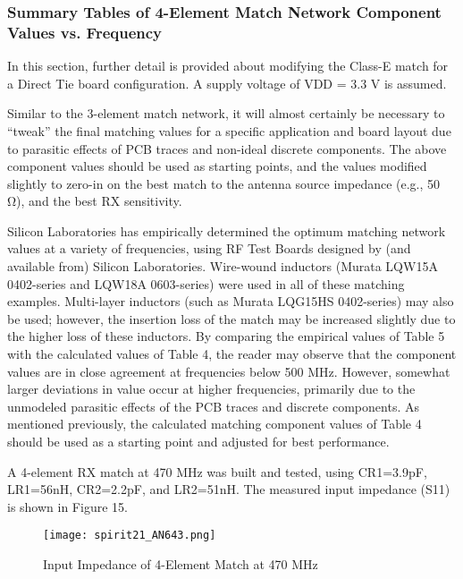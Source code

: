       \subsubsection{Summary Tables of 4-Element Match Network Component Values vs. Frequency}
        In this section, further detail is provided about modifying the Class-E match for a Direct 
        Tie board configuration. A supply voltage of VDD = 3.3 V is assumed.
        
        Similar to the 3-element match network, it will almost certainly be necessary to “tweak” 
        the final matching values for a specific application and board layout due to parasitic 
        effects of PCB traces and non-ideal discrete components. The above component values should 
        be used as starting points, and the values modified slightly to zero-in on the best match 
        to the antenna source impedance (e.g., 50 Ω), and the best RX sensitivity. 
        
        Silicon Laboratories has empirically determined the optimum matching network values at a 
        variety of frequencies, using RF Test Boards designed by (and available from) Silicon 
        Laboratories. Wire-wound inductors (Murata LQW15A 0402-series and LQW18A 0603-series) were 
        used in all of these matching examples. Multi-layer inductors (such as Murata LQG15HS 
        0402-series) may also be used; however, the insertion loss of the match may be increased 
        slightly due to the higher loss of these inductors. By comparing the empirical values of 
        Table 5 with the calculated values of Table 4, the reader may observe that the component 
        values are in close agreement at frequencies below 500 MHz. However, somewhat larger 
        deviations in value occur at higher frequencies, primarily due to the unmodeled 
        parasitic effects of the PCB traces and discrete components. As mentioned previously, the 
        calculated matching component values of Table 4 should be used as a starting point and 
        adjusted for best performance.
        
        A 4-element RX match at 470 MHz was built and tested, using CR1=3.9pF, LR1=56nH, CR2=2.2pF, 
        and LR2=51nH. The measured input impedance (S11) is shown in Figure 15.

        \begin{figure}[ht!] %
          \centering
          \texttt{[image: spirit21\_AN643.png]}
          \caption{Input Impedance of 4-Element Match at 470 MHz \cite[s.~21]{AN643SiliconLabs}}
          \label{EXP001:fig_spirit21}
        \end{figure}
        
